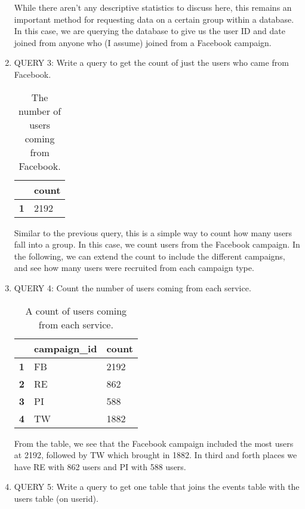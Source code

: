 \documentclass[]{article}
\begin{document}
\begin{enumerate}
While there aren't any descriptive statistics to discuss here, this remains an important method for requesting data on a certain group within a database.  In this case, we are querying the database to give us the user ID and date joined from anyone who (I assume) joined from a Facebook campaign.

\item QUERY 3: Write a query to get the count of just the users who came from Facebook.
\begin{table}[!ht]
	\centering
	\begin{tabular}{| l | l  | }
		\hline
		&\textbf{count} \\
		\hline
		\textbf{1}&2192 \\
		\hline
	\end{tabular}
	\caption{The number of users coming from Facebook.}
\end{table}

Similar to the previous query, this is a simple way to count how many users fall into a group.  In this case, we count users from the Facebook campaign.  In the following, we can extend the count to include the different campaigns, and see how many users were recruited from each campaign type.

\item QUERY 4: Count the number of users coming from each service. 
\pagebreak
\begin{table}[!ht]
	\centering
	\begin{tabular}{| l | l  l | }
		\hline
		&\textbf{campaign\_id} &  \textbf{count} \\
		\hline
		\textbf{1} &FB &  2192\\
		\textbf{2} &RE &  862\\
		\textbf{3} &PI &  588\\
		\textbf{4} &TW &  1882\\
		\hline
	\end{tabular}
	\caption{A count of users coming from each service.}
\end{table}

From the table, we see that the Facebook campaign included the most users at 2192, followed by TW which brought in 1882.  In third and forth places we have RE with 862 users and PI with 588 users.  

\item QUERY 5: Write a query to get one table that joins the events table with the users table (on userid).


\end{enumerate}
\end{document}
